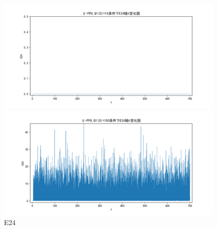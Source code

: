 \documentclass[10pt, a4paper]{article}
\begin{document}
    \begin{figure}[H]
        \begin{minipage}[t]{0.49\textwidth}
            \centering
            \includegraphics[width=\textwidth]{./q6_pics/cmp/E24.png}
        \end{minipage}
        \begin{minipage}[t]{0.49\textwidth}
            \centering
            \includegraphics[width=\textwidth]{./q6_pics/exp/E24.png}
        \end{minipage}
        \caption{E24}\label{fig:E24 in q6}
    \end{figure}
\end{document}
